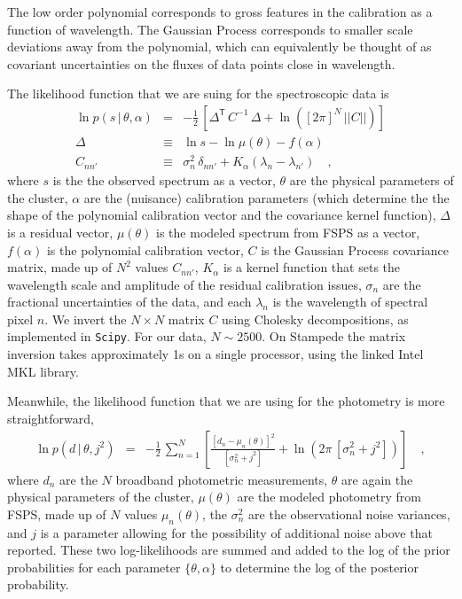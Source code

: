 \documentclass[11pt,preprint]{aastex}
\newcommand{\transpose}[1]{{#1}^{\!\mathsf T}}
\newcommand{\given}{\,|\,}
\renewcommand{\det}[1]{||{#1}||}
\begin{document}
The low order polynomial corresponds to gross features in the calibration as a function of wavelength.
The Gaussian Process corresponds to smaller scale deviations away from the polynomial, which can equivalently be thought of as covariant uncertainties on the fluxes of data points close in wavelength.

The likelihood function that we are suing for the spectroscopic data is 
\begin{eqnarray}\label{eq:spectroscopicLF}
\ln p(s\given\theta,\alpha) &=& -\frac{1}{2}\,\left[\transpose{\Delta}\,C^{-1}\,\Delta + \ln([2\pi]^N\,\det{C}) \right]
\\
\Delta &\equiv& \ln s - \ln \mu(\theta) - f(\alpha) 
\\
C_{nn'} &\equiv& \sigma_n^2 \,\delta_{nn'} +
K_\alpha(\lambda_n - \lambda_{n'})
\quad ,
\end{eqnarray}
where $s$ is the the observed spectrum as a vector,
$\theta$ are the physical parameters of the cluster,
$\alpha$ are the (nuisance) calibration parameters
(which determine the the shape of the polynomial calibration vector and the covariance kernel function),
$\Delta$ is a residual vector,
$\mu(\theta)$ is the modeled spectrum from FSPS as a vector,
$f(\alpha)$ is the polynomial calibration vector,
$C$ is the Gaussian Process covariance matrix,
made up of $N^2$ values $C_{nn'}$,
$K_\alpha$ is a kernel function that sets the wavelength scale and
amplitude of the residual calibration issues,
$\sigma_n$ are the fractional uncertainties of the data,
and each $\lambda_n$ is the wavelength of spectral pixel $n$.
We invert the $N \times N$ matrix $C$ using Cholesky decompositions, as implemented in \texttt{Scipy}. 
For our data, $N\sim 2500$.  
On Stampede the matrix inversion takes approximately 1s on a single processor, using the linked Intel MKL library.

Meanwhile, the likelihood function that we are using for the photometry is more straightforward, 
\begin{eqnarray}\label{eq:photometricLF}
\ln p(d\given\theta,j^2) &=& -\frac{1}{2}\,\sum_{n=1}^N \left[\frac{[d_n - \mu_n(\theta)]^2}{[\sigma_n^2 + j^2]} + \ln(2\pi\,[\sigma_n^2 + j^2]) \right]
\quad ,
\end{eqnarray}
where $d_n$ are the $N$ broadband photometric measurements,
$\theta$ are again the physical parameters of the cluster,
$\mu(\theta)$ are the modeled photometry from FSPS,
made up of $N$ values $\mu_n(\theta)$,
the $\sigma_n^2$ are the observational noise variances,
and $j$ is a parameter allowing for the possibility of additional noise above that reported.
These two log-likelihoods are summed and added to the log of the prior probabilities for each parameter $\{\theta, \alpha\}$ to determine the log of the posterior probability.
\end{document}
